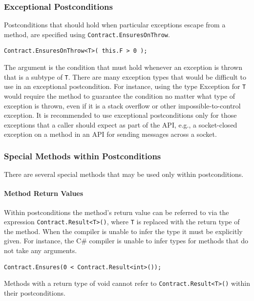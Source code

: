 \documentclass{article}
\newcommand{\code}[1]{\lstinline{#1}}
\newcommand{\csharp}{C\#}
\begin{document}
\subsubsection{Exceptional Postconditions}
Postconditions that should hold when particular exceptions escape from
a method, are specified using \code{Contract.EnsuresOnThrow}.
\begin{lstlisting}
Contract.EnsuresOnThrow<T>( this.F > 0 );
\end{lstlisting}
The argument is the condition that must hold whenever an exception is
thrown that is a subtype of \code{T}. There are many exception types that
would be difficult to use in an exceptional postcondition. For
instance, using the type Exception for \code{T} would require the method to
guarantee the condition no matter what type of exception is thrown,
even if it is a stack overflow or other impossible-to-control
exception. It is recommended to use exceptional postconditions only
for those exceptions that a caller should expect as part of the API,
e.g., a socket-closed exception on a method in an API for sending
messages across a socket.

\subsubsection{Special Methods within Postconditions}
\label{sec:methods-within-post}
There are several special methods that may be used only
within postconditions.  

\paragraph{Method Return Values} 
Within postconditions the method's return value can be referred to via the expression \code{Contract.Result<T>()}, where \code{T} is replaced with the
return type of the method. When the compiler is unable to infer the
type it must be explicitly given. For instance, the \csharp{} compiler
is unable to infer types for methods that do not take any arguments.
\begin{lstlisting}
Contract.Ensures(0 < Contract.Result<int>());
\end{lstlisting}
Methods with a return type of void cannot refer to
\code{Contract.Result<T>()} within their postconditions.  
\end{document}
